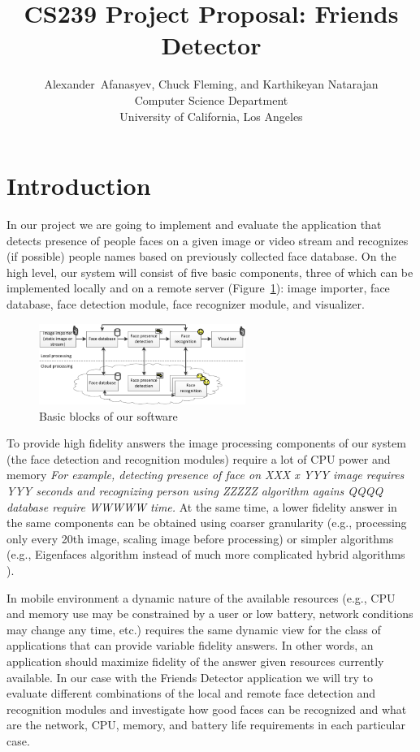 \documentclass[conference]{IEEEtran}
\title{CS239 Project Proposal: Friends Detector}
\author{Alexander~Afanasyev, Chuck Fleming, and Karthikeyan Natarajan \\
\small Computer Science Department \\
\small University of California, Los Angeles 
}
\begin{document}
\maketitle

\section{Introduction}

In our project we are going to implement and evaluate the application that detects presence of people faces on a given image or video stream and recognizes (if possible) people names based on previously collected face database. On the high level, our system will consist of five basic components, three of which can be implemented locally and on a remote server (Figure~\ref{fig:basic blocks}): image importer, face database, face detection module, face recognizer module, and visualizer. 

\begin{figure}[htbp]
	\centering
		\includegraphics[width=0.6\textwidth]{basic_blocks}
	\caption{Basic blocks of our software}
	\label{fig:basic blocks}
\end{figure}

To provide high fidelity answers the image processing components of our system (the face detection and recognition modules) require a lot of CPU power and memory \emph{{\color{red} For example, detecting presence of face on XXX x YYY image requires YYY seconds and recognizing person using ZZZZZ algorithm agains QQQQ database require WWWWW time.}} At the same time, a lower fidelity answer in the same components can be obtained using coarser granularity (e.g., processing only every 20th image, scaling image before processing) or simpler algorithms (e.g., Eigenfaces algorithm \cite{Turk:1991:Eigenfaces-for-recognition} instead of much more complicated hybrid algorithms \cite{Zhao:2003:Face-recognition:}). 

In mobile environment a dynamic nature of the available resources (e.g., CPU and memory use may be constrained by a user or low battery, network conditions may change any time, etc.) requires the same dynamic view for the class of applications that can provide variable fidelity answers. In other words, an application should maximize fidelity of the answer given resources currently available. In our case with the Friends Detector application we will try to evaluate different combinations of the local and remote face detection and recognition modules and investigate how good faces can be recognized and what are the network, CPU, memory, and battery life requirements in each particular case.
\end{document}
